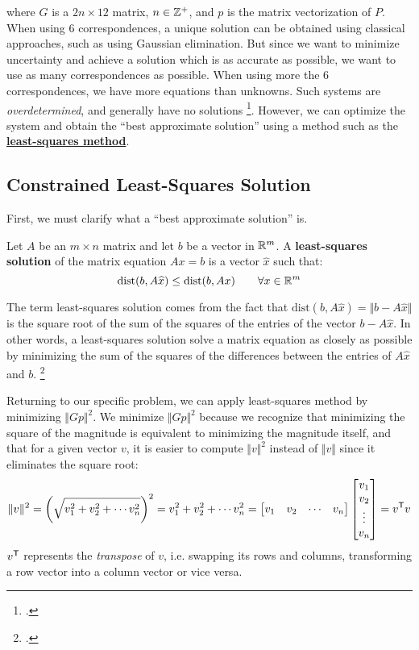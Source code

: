 where $G$ is a $2n \times 12$ matrix, $n \in \mathbb{Z}^+$, and $p$ is the matrix vectorization of $P$. When using 6 correspondences, a unique solution can be obtained using classical approaches, such as using Gaussian elimination. But since we want to minimize uncertainty and achieve a solution which is as accurate as possible, we want to use as many correspondences as possible. When using more the 6 correspondences, we have more equations than unknowns. Such systems are \emph{overdetermined}, and generally have no solutions \footcite{williamsOverdeterminedSystems1990}. However, we can optimize the system and obtain the ``best approximate solution'' using a method such as the \hyperref[sec:clss]{\textbf{least-squares method}}. 

\subsection{Constrained Least-Squares Solution} \label{sec:clss}

First, we must clarify what a ``best approximate solution'' is. 
\begin{definition}
    Let $A$ be an $m \times n$ matrix and let $b$ be a vector in $\mathbb{R}^m$. A \textbf{least-squares solution} of the matrix equation $Ax = b$ is a vector $\widehat{x}$ such that:
    \begin{equation*}
        \mathrm{dist}(b, A\widehat{x}) \leq \mathrm{dist}(b, Ax) \qquad \forall x \in \mathbb{R}^m
    \end{equation*}
\end{definition}

The term least-squares solution comes from the fact that $\mathrm{dist}(b, A\widehat{x})= \Vert b - A\widehat{x} \Vert$ is the square root of the sum of the squares of the entries of the vector $b - A\widehat{x}$. In other words, a least-squares solution solve a matrix equation as closely as possible by minimizing the sum of the squares of the differences between the entries of $A\widehat{x}$ and $b$. \footcite{margalitMethodLeast}

Returning to our specific problem, we can apply least-squares method by minimizing $\Vert Gp \Vert^2$. We minimize $\Vert Gp \Vert^2$ because we recognize that minimizing the square of the magnitude is equivalent to minimizing the magnitude itself, and that for a given vector $v$, it is easier to compute $\Vert v \Vert^2$ instead of $\Vert v \Vert$ since it eliminates the square root:
\begin{equation*}
    \Vert v \Vert^2
     = \left(\sqrt{v_1^2+v_2^2+ \cdots v_n^2}\right)^2 
     = v_1^2+v_2^2+ \cdots v_n^2 
     = \begin{bmatrix}
        v_1 & v_2 & \cdots & v_n
    \end{bmatrix}
    \begin{bmatrix}
        v_1 \\ v_2 \\ \vdots \\ v_n
    \end{bmatrix} 
     = v^{\mathsf{T}} v
\end{equation*}
$v^{\mathsf{T}}$ represents the \emph{transpose} of $v$, i.e. swapping its rows and columns, transforming a row vector into a column vector or vice versa.

